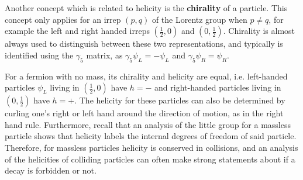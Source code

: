 \documentclass[11pt, oneside]{article}   	%
\theoremstyle{definition}
\numberwithin{equation}{subsection}		%
\begin{document}
Another concept which is related to helicity is the \textbf{chirality} of a particle. This concept only applies for an irrep $(p, q)$ of the Lorentz group when $p\neq q$, for example 
the left and right handed irreps $(\frac{1}{2}, 0)$ and $(0, \frac{1}{2})$. Chirality is almost always used to distinguish between these two representations, and typically is identified 
using the $\gamma_5$ matrix, as $\gamma_5\psi_L = -\psi_L$ and $\gamma_5\psi_R = \psi_R$. 

For a fermion with no mass, its chirality and helicity are equal, i.e. left-handed particles $\psi_L$ living in $(\frac{1}{2}, 0)$ have $h = -$ and right-handed particles living in $(0, \frac{1}{2})$ 
have $h = +$. The helicity for these particles can also be determined by curling one's right or left hand around the direction of motion, as in the right hand rule. 
Furthermore, recall that an analysis of the little group for a massless particle shows that helicity labels the internal degrees of freedom of said particle. Therefore, for massless 
particles helicity is conserved in collisions, and an analysis of the helicities of colliding particles can often make strong statements about if a decay is forbidden or not.
\end{document}
